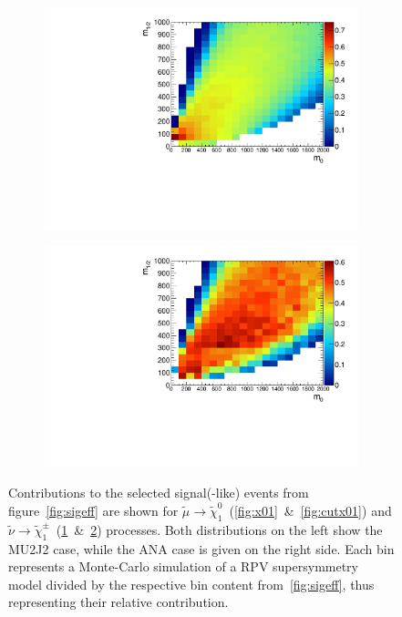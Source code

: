 \begin{figure}[ht!]
  \begin{subfigure}[b]{0.495\textwidth}
    \centering
    \includegraphics[width=\textwidth]{plots/hXplus1NeutRatio.pdf}
    \caption{\label{fig:xplus1neut}}
  \end{subfigure}
  \begin{subfigure}[b]{0.495\textwidth}
    \centering
    \includegraphics[width=\textwidth]{plots/hCutXplus1NeutRatio.pdf}
    \caption{\label{fig:cutxplus1neut}}
  \end{subfigure}
  \caption{Contributions to the selected signal(-like) events from figure~\ref{fig:sigeff} are shown for $\tilde{\mu} \rightarrow \tilde{\chi}^0_1$~(\ref{fig:x01}~\&~\ref{fig:cutx01}) and $\tilde{\nu} \rightarrow \tilde{\chi}^\pm_1$~(\ref{fig:xplus1neut}~\&~\ref{fig:cutxplus1neut}) processes. Both distributions on the left show the MU2J2 case, while the ANA case is given on the right side. Each bin represents a Monte-Carlo simulation of a RPV supersymmetry model divided by the respective bin content from~\ref{fig:sigeff}, thus representing their relative contribution.}
  \label{fig:x01sneuxplusratio}
\end{figure}

